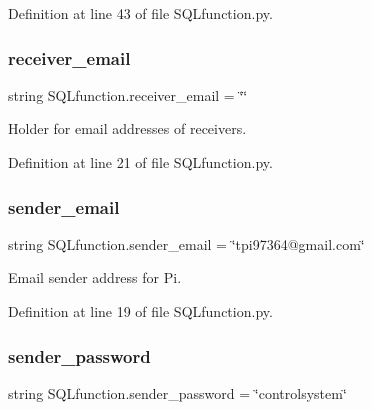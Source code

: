 Definition at line 43 of file S\+Q\+Lfunction.\+py.

\mbox{\label{namespace_s_q_lfunction_a51ebdaf9d64f52b2c266a49020cf12a5}} 
\subsubsection{\texorpdfstring{receiver\+\_\+email}{receiver\_email}}
{\footnotesize\ttfamily string S\+Q\+Lfunction.\+receiver\+\_\+email = \char`\"{}\char`\"{}}



Holder for email addresses of receivers. 



Definition at line 21 of file S\+Q\+Lfunction.\+py.

\mbox{\label{namespace_s_q_lfunction_ac63d06248a3e41c104ae1290bb403c78}} 
\subsubsection{\texorpdfstring{sender\+\_\+email}{sender\_email}}
{\footnotesize\ttfamily string S\+Q\+Lfunction.\+sender\+\_\+email = \char`\"{}tpi97364@gmail.\+com\char`\"{}}



Email sender address for Pi. 



Definition at line 19 of file S\+Q\+Lfunction.\+py.

\mbox{\label{namespace_s_q_lfunction_a0d308a95029254ed328ba365861abdf2}} 
\subsubsection{\texorpdfstring{sender\+\_\+password}{sender\_password}}
{\footnotesize\ttfamily string S\+Q\+Lfunction.\+sender\+\_\+password = \char`\"{}controlsystem\char`\"{}}



